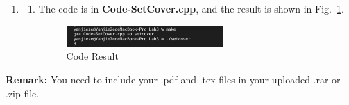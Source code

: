 \documentclass[12pt,a4paper]{article}
\makeatletter
\newtheorem*{solution}{Solution}
\theoremstyle{definition}
\renewenvironment{solution}[1][Solution] {\par\pushQED{\qed}\normalfont\topsep6\p@\@plus6\p@\relax\trivlist\item[\hskip\labelsep\bfseries#1\@addpunct{.}]\ignorespaces}{\popQED\endtrivlist\@endpefalse} \makeatother
\makeatother
\begin{document}
\begin{enumerate}
\begin{solution}
\begin{enumerate}
\item
The code is in \textbf{Code-SetCover.cpp}, and the result is shown in Fig.~\ref{code}.

\begin{figure}[htbp]
    \centering
    \includegraphics[width=0.6\textwidth]{code.png}
    \caption{Code Result}\label{code}
\end{figure}
\end{enumerate}

\end{enumerate}

 \end{solution}







\vspace{20pt}

\textbf{Remark:} You need to include your .pdf and .tex files in your uploaded .rar or .zip file.

\end{document}
